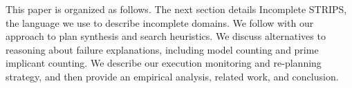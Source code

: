 \documentclass[letterpaper]{article}
\def\FFRISKY{{\tt DeFAULT}}
\def\goalie{{\tt Goalie}}
\begin{document}
% 


This paper is organized as follows.  The next section details Incomplete STRIPS,
the language we use to describe incomplete domains.  We follow with our approach
to plan synthesis and search heuristics.  We discuss alternatives to reasoning
about failure explanations, including model counting and prime implicant
counting.  We describe our execution monitoring and re-planning strategy, and
then provide an empirical analysis, related work, and conclusion.
  
\end{document}
